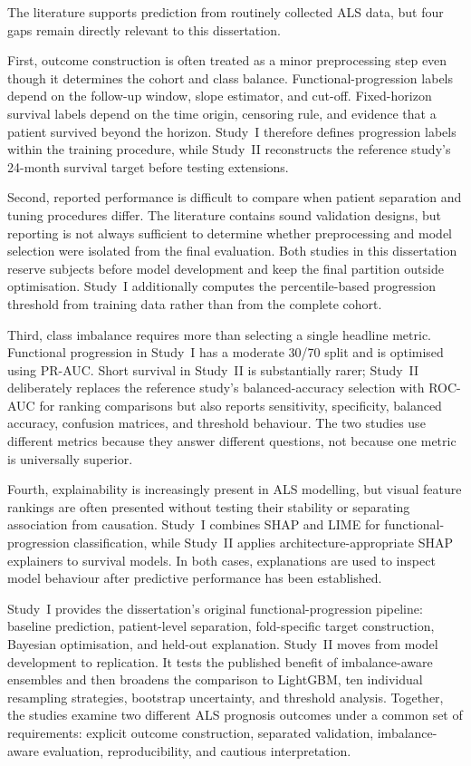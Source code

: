 The literature supports prediction from routinely collected ALS data, but four gaps remain directly relevant to this dissertation.

First, outcome construction is often treated as a minor preprocessing step even though it determines the cohort and class balance. Functional-progression labels depend on the follow-up window, slope estimator, and cut-off. Fixed-horizon survival labels depend on the time origin, censoring rule, and evidence that a patient survived beyond the horizon. Study~I therefore defines progression labels within the training procedure, while Study~II reconstructs the reference study's 24-month survival target before testing extensions.

Second, reported performance is difficult to compare when patient separation and tuning procedures differ. The literature contains sound validation designs, but reporting is not always sufficient to determine whether preprocessing and model selection were isolated from the final evaluation. Both studies in this dissertation reserve subjects before model development and keep the final partition outside optimisation. Study~I additionally computes the percentile-based progression threshold from training data rather than from the complete cohort.

Third, class imbalance requires more than selecting a single headline metric. Functional progression in Study~I has a moderate 30/70 split and is optimised using \gls{PR-AUC}. Short survival in Study~II is substantially rarer; Study~II deliberately replaces the reference study's balanced-accuracy selection with \gls{ROC-AUC} for ranking comparisons but also reports sensitivity, specificity, balanced accuracy, confusion matrices, and threshold behaviour. The two studies use different metrics because they answer different questions, not because one metric is universally superior.

Fourth, explainability is increasingly present in ALS modelling, but visual feature rankings are often presented without testing their stability or separating association from causation. Study~I combines SHAP and \gls{LIME} for functional-progression classification, while Study~II applies architecture-appropriate SHAP explainers to survival models. In both cases, explanations are used to inspect model behaviour after predictive performance has been established.

Study~I provides the dissertation's original functional-progression pipeline: baseline prediction, patient-level separation, fold-specific target construction, Bayesian optimisation, and held-out explanation. Study~II moves from model development to replication. It tests the published benefit of imbalance-aware ensembles and then broadens the comparison to LightGBM, ten individual resampling strategies, bootstrap uncertainty, and threshold analysis. Together, the studies examine two different ALS prognosis outcomes under a common set of requirements: explicit outcome construction, separated validation, imbalance-aware evaluation, reproducibility, and cautious interpretation.
